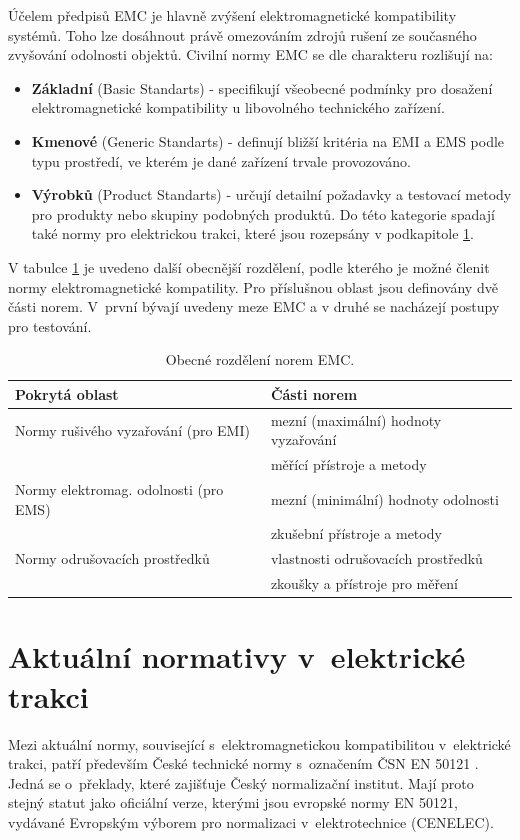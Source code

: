 Účelem předpisů EMC je hlavně zvýšení elektromagnetické kompatibility systémů. Toho lze dosáhnout právě omezováním zdrojů rušení ze současného zvyšování odolnosti objektů. Civilní normy EMC se dle charakteru rozlišují na:
\begin{itemize}
\item {\bf Základní} (Basic Standarts) - specifikují všeobecné podmínky pro dosažení elektromagnetické kompatibility u libovolného technického zařízení.
\item {\bf Kmenové} (Generic Standarts) - definují bližší kritéria na EMI a EMS podle typu prostředí, ve kterém je dané zařízení trvale provozováno.
\item {\bf Výrobků} (Product Standarts) - určují detailní požadavky a testovací metody pro produkty nebo skupiny podobných produktů. Do této kategorie spadají také normy pro elektrickou trakci, které jsou rozepsány v podkapitole \ref{sec:emc_normy_trakce}.
\end{itemize}
V tabulce \ref{tab:emc_deleni} je uvedeno další obecnější rozdělení, podle kterého je možné členit normy elektromagnetické kompatility. Pro příslušnou oblast jsou definovány dvě části norem. V~první bývají uvedeny meze EMC a v druhé se nacházejí postupy pro testování.
\begin{table}[!h]
\begin{center}
  	\caption{Obecné rozdělení norem EMC.}
  	\label{tab:emc_deleni}
\begin{tabular}{|l|l|}
	\hline
	{\bf Pokrytá oblast}  & {\bf Části norem} \\
	\hline
	\hline
	Normy rušivého vyzařování  (pro EMI) & mezní (maximální) hodnoty vyzařování \\
	 & měřící přístroje a metody \\
	\hline
	Normy elektromag. odolnosti  (pro EMS) & mezní (minimální) hodnoty odolnosti \\
	 & zkušební přístroje a metody \\
	\hline
	Normy odrušovacích prostředků  & vlastnosti odrušovacích prostředků \\
	 & zkoušky a přístroje pro měření \\
	\hline
\end{tabular}
\end{center}
\end{table}
\newpage

\section{Aktuální normativy v~elektrické trakci} \label{sec:emc_normy_trakce}
Mezi aktuální normy, související s~elektromagnetickou kompatibilitou v~elektrické trakci, patří především České technické normy s~označením ČSN EN 50121 \cite{csn}. Jedná se o~překlady, které zajišťuje Český normalizační institut. Mají proto stejný statut jako oficiální verze, kterými jsou evropské normy EN 50121, vydávané Evropským výborem pro normalizaci v~elektrotechnice (CENELEC). 

